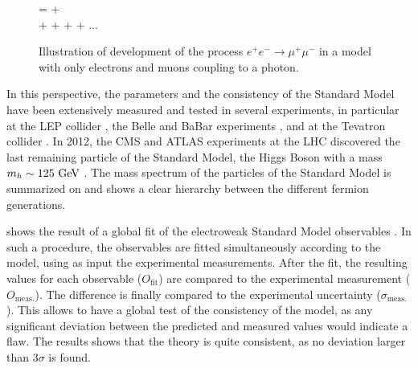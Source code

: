     \begin{figure}
        \centering
        {
            =
            +
            \nonumber
            \\
            +
            +
            +
            +
            ...
            \nonumber
        }
        \caption{Illustration of development of the process $e^+ e^- \rightarrow \mu^+ \mu^-$
        in a model with only electrons and muons coupling to a photon. \label{fig:perturbativeDevelopment}}
    \end{figure}

    In this perspective, the parameters and the consistency of the Standard
    Model have been extensively measured and tested in several experiments, in particular
    at the LEP collider \cite{LEP}, the Belle and BaBar experiments \cite{BelleAndBabar}, and at the Tevatron collider \cite{Tevatron}. In 2012,
    the CMS and ATLAS experiments at the LHC discovered the last remaining particle of the
    Standard Model, the Higgs Boson with a mass $m_{h} \sim 125~\text{GeV}$ \cite{CMSHiggs,ATLASHiggs}. The mass
    spectrum of the particles of the Standard Model is summarized on  and
    shows a clear hierarchy between the different fermion generations.

     shows the result of a global fit of the electroweak
    Standard Model observables \cite{GFitter}. In such a procedure, the observables are
    fitted simultaneously according to the model, using as input the experimental measurements.
    After the fit, the resulting values for each observable ($O_\text{fit}$) are compared to
    the experimental measurement ($O_\text{meas.}$). The difference is finally compared to
    the experimental uncertainty ($\sigma_\text{meas.}$). This allows to have a global test of the consistency of
    the model, as any significant deviation between the predicted and measured values would
    indicate a flaw. The results shows that the theory is quite consistent, as no deviation
    larger than 3$\sigma$ is found.

